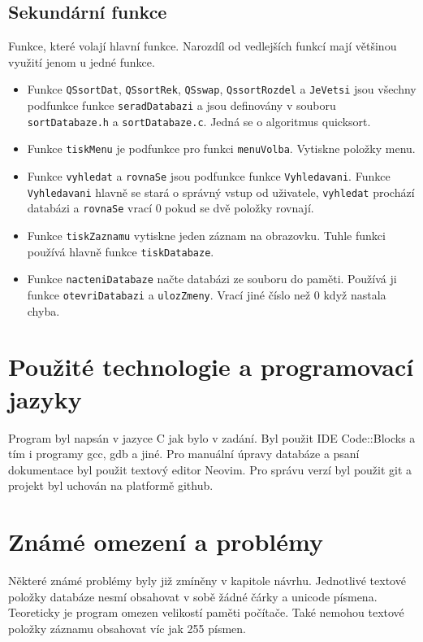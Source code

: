 \subsection{Sekundární funkce}
Funkce, které volají hlavní funkce. Narozdíl od vedlejších funkcí mají většinou využití jenom u jedné funkce. 

\begin{itemize}
  \item Funkce \texttt{QSsortDat}, \texttt{QSsortRek}, \texttt{QSswap}, \texttt{QssortRozdel} a \texttt{JeVetsi} jsou všechny podfunkce 
  funkce \texttt{seradDatabazi} a jsou definovány v souboru \texttt{sortDatabaze.h} a \texttt{sortDatabaze.c}. Jedná se o algoritmus 
  quicksort. 
  
  \item Funkce \texttt{tiskMenu} je podfunkce pro funkci \texttt{menuVolba}. Vytiskne položky menu.

  \item Funkce \texttt{vyhledat} a \texttt{rovnaSe} jsou podfunkce funkce \texttt{Vyhledavani}. Funkce \texttt{Vyhledavani} 
  hlavně se stará o správný vstup od uživatele, \texttt{vyhledat} prochází databázi a \texttt{rovnaSe} vrací 0 pokud se 
  dvě položky rovnají.

  \item Funkce \texttt{tiskZaznamu} vytiskne jeden záznam na obrazovku. Tuhle funkci používá hlavně funkce \texttt{tiskDatabaze}. 

  \item Funkce \texttt{nacteniDatabaze} načte databázi ze souboru do paměti. Používá ji funkce \texttt{otevriDatabazi} 
  a \texttt{ulozZmeny}. Vrací jiné číslo než 0 když nastala chyba. 

\end{itemize}

\section{Použité technologie a programovací jazyky}
Program byl napsán v jazyce C jak bylo v zadání. Byl použit IDE Code::Blocks a tím i programy gcc, gdb a jiné. 
Pro manuální úpravy databáze  a psaní dokumentace byl použit textový editor Neovim. Pro 
správu verzí byl použit git a projekt byl uchován na platformě github.

\section{Známé omezení a problémy}
Některé známé problémy byly již zmíněny v kapitole návrhu. Jednotlivé textové položky databáze nesmí obsahovat v sobě 
žádné čárky a unicode písmena. Teoreticky je program omezen velikostí paměti počítače. Také nemohou textové položky 
záznamu obsahovat víc jak 255 písmen. 



